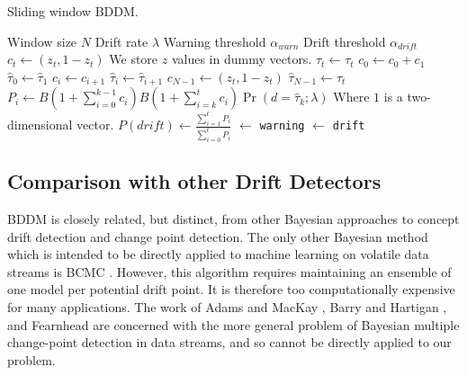 \begin{algorithm}
    \caption{Sliding window BDDM.}
    \label{alg:bddm_win}
    \begin{algorithmic}
        \Require Window size $N$
        \Require Drift rate $\lambda$
        \Require Warning threshold $\alpha_{warn}$
        \Require Drift threshold $\alpha_{drift}$
            \State $c_t \gets (z_t, 1-z_t)$
            \Comment We store $z$ values in dummy vectors.
            \State $\hat{\tau}_t \gets \tau_t$
          \Else
            \State $c_0 \gets c_0 + c_1$
            \State $\hat{\tau}_0 \gets \hat{\tau}_1$
              \State $c_i \gets c_{i+1}$
              \State $\hat{\tau}_i \gets \hat{\tau}_{i+1}$
            \EndFor
            \State $c_{N-1} \gets (z_t, 1-z_t)$
            \State $\hat{\tau}_{N-1} \gets \tau_t$
          \EndIf
            \State $P_i \gets B\left(1+\sum_{i=0}^{k-1}c_i\right) B\left(1+\sum_{i=k}^t c_i\right) \Pr(d=\hat{\tau}_k;\lambda)$
            \Comment Where $1$ is a two-dimensional vector.
          \EndFor
          \State $P(drift) \gets \frac{\sum_{i=1}^t P_i}{\sum_{i=0}^t P_i}$
             $\gets$ {\tt warning}
             $\gets$ {\tt drift}
          \EndIf
        \EndFor
    \end{algorithmic}
\end{algorithm}

\subsection{Comparison with other Drift Detectors}

BDDM is closely related, but distinct, from other Bayesian approaches to concept drift detection and change point detection. The only other Bayesian method which is intended to be directly applied to machine learning on volatile data streams is BCMC \cite{BCMC}. However, this algorithm requires maintaining an ensemble of one model per potential drift point. It is therefore too computationally expensive for many applications. The work of Adams and MacKay \cite{adams_mackay}, Barry and Hartigan \cite{barry_hartigan}, and Fearnhead \cite{fearnhead} are concerned with the more general problem of Bayesian multiple change-point detection in data streams, and so cannot be directly applied to our problem.

